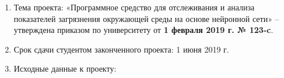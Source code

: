     \begin{enumerate}[label=\textbf{\arabic*}, itemsep=1em,
      leftmargin=*,
      itemindent=\taskLiskSectionItemLeftIndent-\taskLiskSubsectionDelta]
      \item Тема проекта: «Программное средство для отслеживания и анализа показателей загрязнения окружающей среды на основе нейронной сети» -- утверждена приказом по университету от
      \textbf{1 февраля 2019 г. № 123-c}.
      \item Срок сдачи студентом законченного проекта: 1 июня 2019 г.
      \item Исходные данные к проекту:


\end{enumerate}
